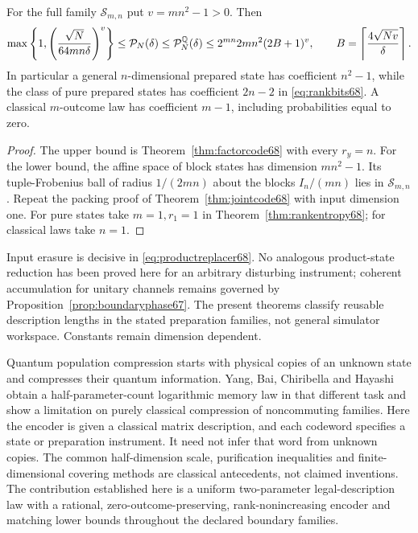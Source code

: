 \begin{corollary}\label{cor:fullboundary68}
For the full family $\mathcal S_{m,n}$ put $v=mn^2-1>0$. Then
\begin{equation}\label{eq:fullboundary68}
 \max\left\{1,\left(\frac{\sqrt N}{64mn\delta}\right)^v\right\}
 \le\mathcal P_N(\delta)\le\mathcal P_N^{\mathbb Q}(\delta)
 \le 2^{mn}2mn^2(2B+1)^v,
 \qquad B=\left\lceil\frac{4\sqrt{Nv}}\delta\right\rceil.
\end{equation}
In particular a general $n$-dimensional prepared state has coefficient
$n^2-1$, while the class of pure prepared states has coefficient
$2n-2$ in \eqref{eq:rankbits68}. A classical $m$-outcome law has
coefficient $m-1$, including probabilities equal to zero.
\end{corollary}
\begin{proof}
The upper bound is Theorem~\ref{thm:factorcode68} with every $r_y=n$.
For the lower bound, the affine space of block states has dimension
$mn^2-1$. Its tuple-Frobenius ball of radius $1/(2mn)$ about the
blocks $I_n/(mn)$ lies in $\mathcal S_{m,n}$. Repeat the packing proof
of Theorem~\ref{thm:jointcode68} with input dimension one. For pure
states take $m=1,r_1=1$ in Theorem~\ref{thm:rankentropy68}; for
classical laws take $n=1$.
\end{proof}

\begin{remark}\label{rem:boundaryscope68}
Input erasure is decisive in \eqref{eq:productreplacer68}. No analogous
product-state reduction has been proved here for an arbitrary disturbing
instrument; coherent accumulation for unitary channels remains governed
by Proposition~\ref{prop:boundaryphase67}. The present theorems classify
reusable description lengths in the stated preparation families, not
general simulator workspace. Constants remain dimension dependent.

Quantum population compression starts with physical copies of an
unknown state and compresses their quantum information. Yang, Bai,
Chiribella and Hayashi \cite{YBCH68} obtain a half-parameter-count
logarithmic memory law in that different task and show a limitation
on purely classical compression of noncommuting families. Here the
encoder is given a classical matrix description, and each codeword
specifies a state or preparation instrument. It need not infer that
word from unknown copies. The common half-dimension scale, purification
inequalities and finite-dimensional covering methods are classical
antecedents, not claimed inventions. The contribution established here
is a uniform two-parameter legal-description law with a rational,
zero-outcome-preserving, rank-nonincreasing encoder and matching lower
bounds throughout the declared boundary families.
\end{remark}
